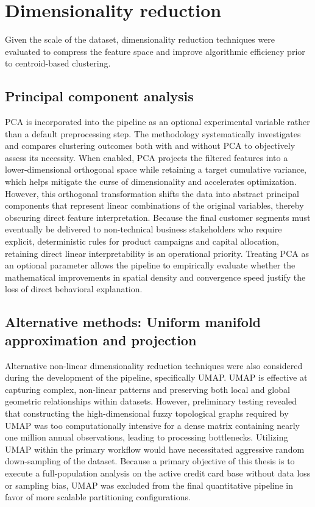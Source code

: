     \section{Dimensionality reduction}
    \label{sec:dimensionality_reduction}
    Given the scale of the dataset, dimensionality reduction techniques were evaluated to compress the feature space and improve algorithmic efficiency prior to centroid-based clustering.
    
        \subsection{Principal component analysis}
        \label{subsec:pca}
        PCA is incorporated into the pipeline as an optional experimental variable rather than a default preprocessing step. The methodology systematically investigates and compares clustering outcomes both with and without PCA to objectively assess its necessity. When enabled, PCA projects the filtered features into a lower-dimensional orthogonal space while retaining a target cumulative variance, which helps mitigate the curse of dimensionality and accelerates optimization. However, this orthogonal transformation shifts the data into abstract principal components that represent linear combinations of the original variables, thereby obscuring direct feature interpretation. Because the final customer segments must eventually be delivered to non-technical business stakeholders who require explicit, deterministic rules for product campaigns and capital allocation, retaining direct linear interpretability is an operational priority. Treating PCA as an optional parameter allows the pipeline to empirically evaluate whether the mathematical improvements in spatial density and convergence speed justify the loss of direct behavioral explanation.
        
        \subsection{Alternative methods: Uniform manifold approximation and projection}
        \label{subsec:manifold}
        Alternative non-linear dimensionality reduction techniques were also considered during the development of the pipeline, specifically UMAP. UMAP is effective at capturing complex, non-linear patterns and preserving both local and global geometric relationships within datasets. However, preliminary testing revealed that constructing the high-dimensional fuzzy topological graphs required by UMAP was too computationally intensive for a dense matrix containing nearly one million annual observations, leading to processing bottlenecks. Utilizing UMAP within the primary workflow would have necessitated aggressive random down-sampling of the dataset. Because a primary objective of this thesis is to execute a full-population analysis on the active credit card base without data loss or sampling bias, UMAP was excluded from the final quantitative pipeline in favor of more scalable partitioning configurations.
        
